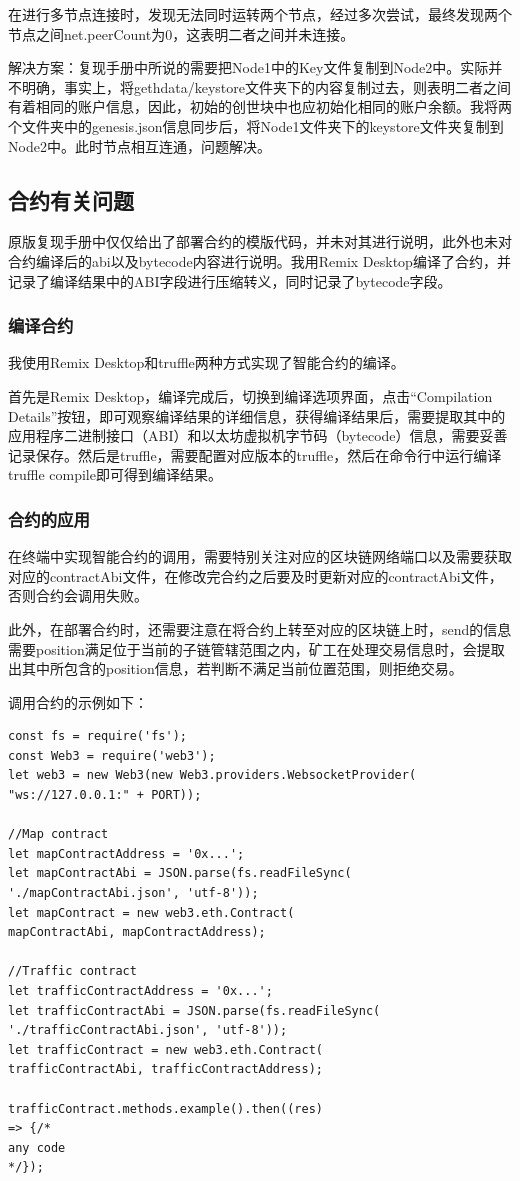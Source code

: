 在进行多节点连接时，发现无法同时运转两个节点，经过多次尝试，最终发现两个节点之间net.peerCount为0，这表明二者之间并未连接。

解决方案：复现手册中所说的需要把Node1中的Key文件复制到Node2中。实际并不明确，事实上，将gethdata/keystore文件夹下的内容复制过去，则表明二者之间有着相同的账户信息，因此，初始的创世块中也应初始化相同的账户余额。我将两个文件夹中的genesis.json信息同步后，将Node1文件夹下的keystore文件夹复制到Node2中。此时节点相互连通，问题解决。

\subsection{合约有关问题}

原版复现手册中仅仅给出了部署合约的模版代码，并未对其进行说明，此外也未对合约编译后的abi以及bytecode内容进行说明。我用Remix Desktop编译了合约，并记录了编译结果中的ABI字段进行压缩转义，同时记录了bytecode字段。

\subsubsection{编译合约}

我使用Remix Desktop和truffle两种方式实现了智能合约的编译。

首先是Remix Desktop，编译完成后，切换到编译选项界面，点击“Compilation Details”按钮，即可观察编译结果的详细信息，获得编译结果后，需要提取其中的应用程序二进制接口（ABI）和以太坊虚拟机字节码（bytecode）信息，需要妥善记录保存。然后是truffle，需要配置对应版本的truffle，然后在命令行中运行编译truffle compile即可得到编译结果。

\subsubsection{合约的应用}

在终端中实现智能合约的调用，需要特别关注对应的区块链网络端口以及需要获取对应的contractAbi文件，在修改完合约之后要及时更新对应的contractAbi文件，否则合约会调用失败。

此外，在部署合约时，还需要注意在将合约上转至对应的区块链上时，send的信息需要position满足位于当前的子链管辖范围之内，矿工在处理交易信息时，会提取出其中所包含的position信息，若判断不满足当前位置范围，则拒绝交易。

调用合约的示例如下：

\begin{verbatim}
const fs = require('fs');
const Web3 = require('web3');
let web3 = new Web3(new Web3.providers.WebsocketProvider(
"ws://127.0.0.1:" + PORT));

//Map contract
let mapContractAddress = '0x...';
let mapContractAbi = JSON.parse(fs.readFileSync(
'./mapContractAbi.json', 'utf-8'));
let mapContract = new web3.eth.Contract(
mapContractAbi, mapContractAddress);

//Traffic contract
let trafficContractAddress = '0x...';
let trafficContractAbi = JSON.parse(fs.readFileSync(
'./trafficContractAbi.json', 'utf-8'));
let trafficContract = new web3.eth.Contract(
trafficContractAbi, trafficContractAddress);

trafficContract.methods.example().then((res) 
=> {/* 
any code
*/});
\end{verbatim}

